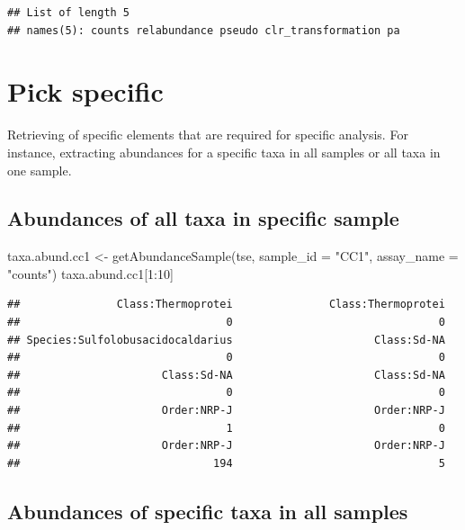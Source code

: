 \documentclass[
]{book}
\newenvironment{Shaded}{\begin{snugshade}}{\end{snugshade}}
\newcommand{\AttributeTok}[1]{\textcolor[rgb]{0.77,0.63,0.00}{#1}}
\newcommand{\DecValTok}[1]{\textcolor[rgb]{0.00,0.00,0.81}{#1}}
\newcommand{\FunctionTok}[1]{\textcolor[rgb]{0.00,0.00,0.00}{#1}}
\newcommand{\NormalTok}[1]{#1}
\newcommand{\OtherTok}[1]{\textcolor[rgb]{0.56,0.35,0.01}{#1}}
\newcommand{\SpecialCharTok}[1]{\textcolor[rgb]{0.00,0.00,0.00}{#1}}
\newcommand{\StringTok}[1]{\textcolor[rgb]{0.31,0.60,0.02}{#1}}
\begin{document}
\begin{verbatim}
## List of length 5
## names(5): counts relabundance pseudo clr_transformation pa
\end{verbatim}

\hypertarget{pick-specific}{%
\section{Pick specific}\label{pick-specific}}

Retrieving of specific elements that are required for specific analysis. For
instance, extracting abundances for a specific taxa in all samples or all taxa
in one sample.

\hypertarget{abundances-of-all-taxa-in-specific-sample}{%
\subsection{Abundances of all taxa in specific sample}\label{abundances-of-all-taxa-in-specific-sample}}

\begin{Shaded}
\begin{Highlighting}[]
\NormalTok{taxa.abund.cc1 }\OtherTok{\textless{}{-}} \FunctionTok{getAbundanceSample}\NormalTok{(tse, }
                                     \AttributeTok{sample\_id =} \StringTok{"CC1"}\NormalTok{,}
                                     \AttributeTok{assay\_name =} \StringTok{"counts"}\NormalTok{)}
\NormalTok{taxa.abund.cc1[}\DecValTok{1}\SpecialCharTok{:}\DecValTok{10}\NormalTok{]}
\end{Highlighting}
\end{Shaded}

\begin{verbatim}
##               Class:Thermoprotei               Class:Thermoprotei 
##                                0                                0 
## Species:Sulfolobusacidocaldarius                      Class:Sd-NA 
##                                0                                0 
##                      Class:Sd-NA                      Class:Sd-NA 
##                                0                                0 
##                      Order:NRP-J                      Order:NRP-J 
##                                1                                0 
##                      Order:NRP-J                      Order:NRP-J 
##                              194                                5
\end{verbatim}

\hypertarget{abundances-of-specific-taxa-in-all-samples}{%
\subsection{Abundances of specific taxa in all samples}\label{abundances-of-specific-taxa-in-all-samples}}
\end{document}

